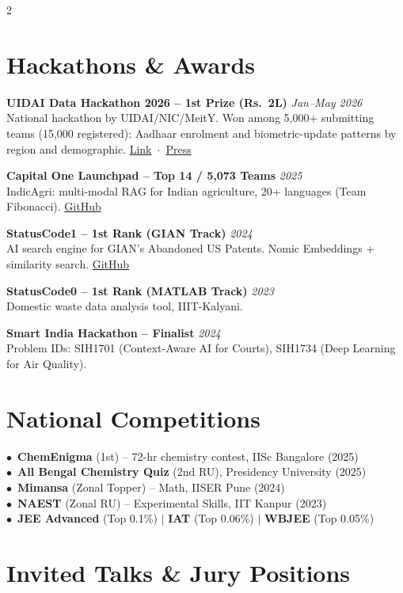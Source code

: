 \documentclass[a4paper,9pt]{article}
\newcommand{\entry}[3]{%
  {\scriptsize\textbf{#1}} \hfill {\tiny\textit{#2}}\\[-0.1em]
  {\tiny #3}\vspace{1.5pt}%
}
\begin{document}
\begin{paracol}{2}
	\switchcolumn

	\section{Hackathons \& Awards}

	\entry{UIDAI Data Hackathon 2026 -- 1st Prize (Rs.~2L)}{Jan--May 2026}{%
		National hackathon by UIDAI/NIC/MeitY. Won among 5,000+ submitting teams (15,000 registered): Aadhaar enrolment and biometric-update patterns by region and demographic.
		\href{https://event.data.gov.in/challenge/uidai-data-hackathon-2026/}{\tiny Link}~$\cdot$~\href{https://www.pib.gov.in/PressReleasePage.aspx?PRID=2259168}{\tiny Press}}

	\entry{Capital One Launchpad -- Top 14 / 5,073 Teams}{2025}{%
		IndicAgri: multi-modal RAG for Indian agriculture, 20+ languages (Team Fibonacci).
		\href{https://github.com/Shuvam-Banerji-Seal/Answering_Agriculture}{\tiny GitHub}}

	\entry{StatusCode1 -- 1st Rank (GIAN Track)}{2024}{%
		AI search engine for GIAN's Abandoned US Patents. Nomic Embeddings + similarity search.
		\href{https://github.com/Shuvam-Banerji-Seal/LLM-based-Searcher-for-GIAN-s-Abandoned-US-Patents}{\tiny GitHub}}

	\entry{StatusCode0 -- 1st Rank (MATLAB Track)}{2023}{%
		Domestic waste data analysis tool, IIIT-Kalyani.}

	\entry{Smart India Hackathon -- Finalist}{2024}{%
		Problem IDs: SIH1701 (Context-Aware AI for Courts), SIH1734 (Deep Learning for Air Quality).}

	\section{National Competitions}

	 {\tiny
	  $\bullet$~\textbf{ChemEnigma} (1st) -- 72-hr chemistry contest, IISc Bangalore (2025)\\
	  $\bullet$~\textbf{All Bengal Chemistry Quiz} (2nd RU), Presidency University (2025)\\
	  $\bullet$~\textbf{Mimansa} (Zonal Topper) -- Math, IISER Pune (2024)\\
	  $\bullet$~\textbf{NAEST} (Zonal RU) -- Experimental Skills, IIT Kanpur (2023)\\
	  $\bullet$~\textbf{JEE Advanced} (Top 0.1\%) $\mid$ \textbf{IAT} (Top 0.06\%) $\mid$ \textbf{WBJEE} (Top 0.05\%)
	 }

	\section{Invited Talks \& Jury Positions}


\end{paracol}
\end{document}

